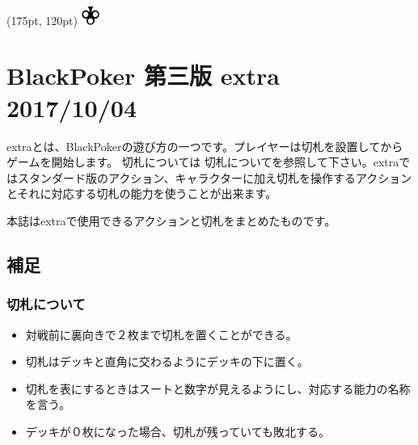 \documentclass[twocolumn,a5paper,papersize,10pt]{jarticle}
\title{\empty}
\author{\empty}
\date{\empty}
\begin{document}
\begin{textblock*}{0.4\linewidth}(175pt, 120pt)
    \centering
    \includegraphics[width=0.6cm]{blackpoker_logo.pdf}
\end{textblock*}

\section*{\textrm{BlackPoker} 第三版 extra {\scriptsize 2017/10/04}}

\scriptsize%
\renewcommand{\labelitemi}{・}%

extraとは、BlackPokerの遊び方の一つです。プレイヤーは切札を設置してからゲームを開始します。
切札については 切札についてを参照して下さい。extraではスタンダード版のアクション、キャラクターに加え切札を操作するアクションとそれに対応する切札の能力を使うことが出来ます。

本誌はextraで使用できるアクションと切札をまとめたものです。

\vspace{-3zh}%

\subsection*{補足}
\subsubsection*{切札について}
\vspace{-1zh}%
\begin{itemize}
\setlength{\leftskip}{-0.3cm}%
\setlength{\parskip}{0pt}      %

\item 対戦前に裏向きで２枚まで切札を置くことができる。
\item 切札はデッキと直角に交わるようにデッキの下に置く。
\item 切札を表にするときはスートと数字が見えるようにし、対応する能力の名称を言う。
\item デッキが０枚になった場合、切札が残っていても敗北する。
\end{itemize}
\vspace{-3.5zh}%
\end{document}
